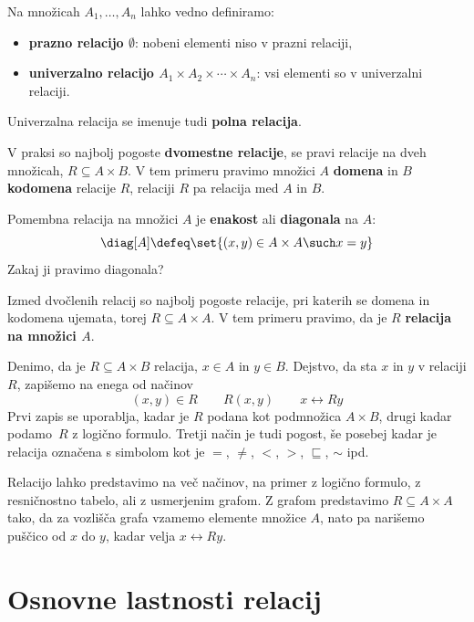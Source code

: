 Na množicah $A_1, \ldots, A_n$ lahko vedno definiramo:
%
\begin{itemize}
\item \textbf{prazno relacijo $\emptyset$}: nobeni elementi niso v prazni relaciji,
\item \textbf{univerzalno relacijo $A_1 \times A_2 \times \cdots \times A_n$}: vsi elementi so v univerzalni relaciji.
\end{itemize}
%
Univerzalna relacija se imenuje tudi \textbf{polna relacija}.

V praksi so najbolj pogoste \textbf{dvomestne relacije}, se pravi relacije na dveh
množicah, $R \subseteq A \times B$.
V tem primeru pravimo množici $A$ \textbf{domena} in $B$ \textbf{kodomena} relacije $R$, relaciji $R$ pa relacija med $A$ in $B$.

Pomembna relacija na množici $A$ je \textbf{enakost} ali \textbf{diagonala} na $A$:
%
\begin{equation*}
    \diag[A] \defeq \set{ (x, y) \in A \times A \such x = y }
\end{equation*}
%
Zakaj ji pravimo diagonala?

Izmed dvočlenih relacij so najbolj pogoste relacije, pri katerih se domena in
kodomena ujemata, torej $R \subseteq A \times A$. V tem primeru pravimo, da je $R$ \textbf{relacija na množici $A$}.

Denimo, da je $R \subseteq A \times B$ relacija, $x \in A$ in $y \in B$. Dejstvo, da sta $x$ in $y$ v relaciji $R$, zapišemo na enega od načinov
%
\begin{equation*}
  (x, y) \in R
  \qquad
  R(x, y)
  \qquad
  x \rel{R} y
\end{equation*}
%
Prvi zapis se uporablja, kadar je $R$ podana kot podmnožica $A \times B$, drugi kadar
podamo~$R$ z logično formulo. Tretji način je tudi pogost, še posebej kadar je
relacija označena s simbolom kot je $=$, $\neq$, $<$, $>$, $\sqsubseteq$, $\sim$ ipd.

Relacijo lahko predstavimo na več načinov, na primer z logično formulo, z resničnostno tabelo, ali z usmerjenim grafom.
%
Z grafom predstavimo $R \subseteq A \times A$ tako, da za vozlišča grafa vzamemo
elemente množice $A$, nato pa narišemo puščico od $x$ do $y$, kadar velja $x \rel{R} y$.


\section{Osnovne lastnosti relacij}

